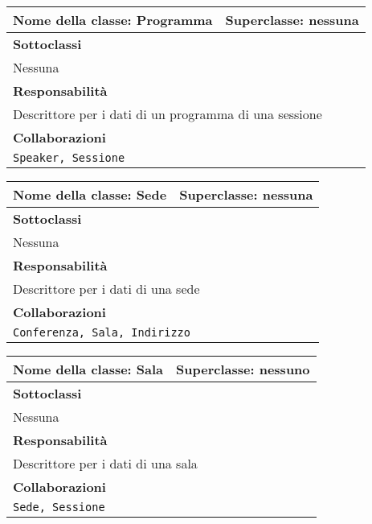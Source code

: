 \begin{table}[h!]
\centering
\begin{tabular}{|l|l|}
\hline
\textbf{Nome della classe:} Programma & \textbf{Superclasse}: nessuna \\ \hline
\multicolumn{2}{|l|}{\textbf{Sottoclassi}}\\
\multicolumn{2}{|l|}{Nessuna} \\ \hline
\multicolumn{2}{|l|}{\textbf{Responsabilità}}\\
\multicolumn{2}{|l|}{Descrittore per i dati di un programma di una sessione} \\ \hline
\multicolumn{2}{|l|}{\textbf{Collaborazioni}}\\
\multicolumn{2}{|l|}{\texttt{Speaker, Sessione}} \\ \hline
\end{tabular}
\end{table}
\begin{table}[h!]
\centering
\begin{tabular}{|l|l|}
\hline
\textbf{Nome della classe:} Sede & \textbf{Superclasse}: nessuna \\ \hline
\multicolumn{2}{|l|}{\textbf{Sottoclassi}}\\
\multicolumn{2}{|l|}{Nessuna} \\ \hline
\multicolumn{2}{|l|}{\textbf{Responsabilità}}\\
\multicolumn{2}{|l|}{Descrittore per i dati di una sede} \\ \hline
\multicolumn{2}{|l|}{\textbf{Collaborazioni}}\\
\multicolumn{2}{|l|}{\texttt{Conferenza, Sala, Indirizzo}} \\ \hline
\end{tabular}
\end{table}
\begin{table}[h!]
\centering
\begin{tabular}{|l|l|}
\hline
\textbf{Nome della classe:} Sala & \textbf{Superclasse}: nessuno \\ \hline
\multicolumn{2}{|l|}{\textbf{Sottoclassi}}\\
\multicolumn{2}{|l|}{Nessuna} \\ \hline
\multicolumn{2}{|l|}{\textbf{Responsabilità}}\\
\multicolumn{2}{|l|}{Descrittore per i dati di una sala} \\ \hline
\multicolumn{2}{|l|}{\textbf{Collaborazioni}}\\
\multicolumn{2}{|l|}{\texttt{Sede, Sessione}} \\ \hline
\end{tabular}
\end{table}

